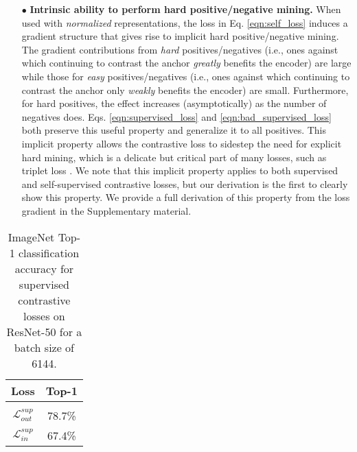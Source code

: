 \begin{itemize}[leftmargin=*]
  \item[$\bullet$] \textbf{Intrinsic ability to perform hard positive/negative mining.} When used with \emph{normalized} representations, the loss in Eq. \ref{eqn:self_loss} induces a gradient structure that gives rise to implicit hard positive/negative mining. The gradient contributions from \emph{hard} positives/negatives (i.e., ones against which continuing to contrast the anchor \emph{greatly} benefits the encoder) are large while those for \emph{easy} positives/negatives (i.e., ones against which continuing to contrast the anchor only \emph{weakly} benefits the encoder) are small. Furthermore, for hard positives, the effect increases (asymptotically) as the number of negatives does. Eqs. \ref{eqn:supervised_loss} and \ref{eqn:bad_supervised_loss} both preserve this useful property and generalize it to all positives. This implicit property allows the contrastive loss to sidestep the need for explicit hard mining, which is a delicate but critical part of many losses, such as triplet loss \cite{schroff2015facenet}. We note that this implicit property applies to both supervised and self-supervised contrastive losses, but our derivation is the first to clearly show this property. We provide a full derivation of this property from the loss gradient in the Supplementary material.
\end{itemize}

\begin{wraptable}{r}{0.35\textwidth}
    \vspace{-20pt}
    \centering
  \centering
  \begin{tabular}{cc}
    \toprule
    Loss & Top-1 \\
    \midrule
    &\\[-.9em]
    $\mathcal{L}_{out}^{sup}$ & 78.7\% \\
    $\mathcal{L}_{in}^{sup}$ & 67.4\% \\
    \bottomrule
  \end{tabular}
  \caption{\small ImageNet Top-1 classification accuracy for supervised contrastive losses on ResNet-50 for a batch size of 6144. %
  }
  \vspace{-10pt}
  \label{tab:supervised_loss_variants}
\end{wraptable}



